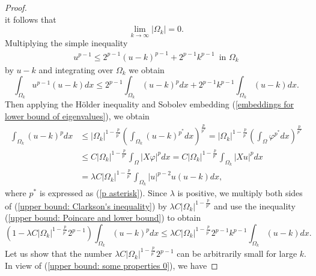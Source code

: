 \documentclass[a4paper,12pt,reqno]{amsart}
\renewcommand\eqref[1]{(\ref{#1})} %
\numberwithin{equation}{section}
\theoremstyle{plain}
\theoremstyle{definition}
\begin{document}
\begin{proof}
\begin{equation}
\end{equation}
it follows that
\begin{equation}\label{upper bound: some properties}
 \lim_{k\to \infty}\left|\Omega_{k}\right|=0.
\end{equation}
Multiplying the simple inequality
\begin{equation}
\begin{aligned}
u^{p-1}   \leq 2^{p-1}(u-k)^{p-1}+2^{p-1} k^{p-1} \enspace \text{in } \Omega_{k}
\end{aligned}
\end{equation}
by $u-k$ and integrating over $\Omega_{k}$ we obtain
\begin{equation}\label{upper bound: Clarkson's inequality}
\int_{\Omega_{k}} u^{p-1}(u-k) d x \leq 2^{p-1} \int_{\Omega_{k}}(u-k)^{p} d x+2^{p-1} k^{p-1} \int_{\Omega_{k}}(u-k) d x.
\end{equation}
Then applying the H\"older inequality and  Sobolev embedding \eqref{embeddings for lower bound of eigenvalues}, we obtain
\begin{equation}\label{upper bound: Poincare and lower bound}
\begin{aligned}
\int_{\Omega_{k}}(u-k)^{p} d x &\leq|\Omega_{k}|^{1-\frac{p}{p^{*}}}\left(\int_{\Omega_{k}}(u-k)^{p^{*}}dx\right)^{\frac{p}{p^{*}}}= |\Omega_{k}|^{1-\frac{p}{p^{*}}}\left(\int_{\Omega}\varphi^{p^{*}}dx\right)^{\frac{p}{p^{*}}}\\
&\leq C \left|\Omega_{k}\right|^{1-\frac{p}{p^{*}}} \int_{\Omega}|X \varphi|^{p} d x=C\left|\Omega_{k}\right|^{1-\frac{p}{p^{*}}} \int_{\Omega_{k}}|X u|^{p} d x\\
&=\lambda  C \left|\Omega_{k}\right|^{1-\frac{p}{p^{*}}}\int_{\Omega_{k}}|u|^{p-2}u (u-k)dx,
\end{aligned}
\end{equation}
where $p^{*}$ is expressed as \eqref{p asterisk}. Since $\lambda$ is positive, we multiply both sides of \eqref{upper bound: Clarkson's inequality} by $\lambda  C \left|\Omega_{k}\right|^{1-\frac{p}{p^{*}}}$ and use the inequality \eqref{upper bound: Poincare and lower bound} to obtain
\begin{equation*}
\left(1-\lambda C \left|\Omega_{k}\right|^{1-\frac{p}{p^{*}}}2^{p-1}\right) \int_{\Omega_{k}}(u-k)^{p} d x \leq \lambda C\left|\Omega_{k}\right|^{1-\frac{p}{p^{*}}}2^{p-1}k^{p-1}  \int_{\Omega_{k}}(u-k) d x .
\end{equation*}
Let us show that the number $\lambda C \left|\Omega_{k}\right|^{1-\frac{p}{p^{*}}} 2^{p-1}$ can be arbitrarily small for large $k$. In view of \eqref{upper bound: some properties 0}, we have

\end{proof}
\end{document}
